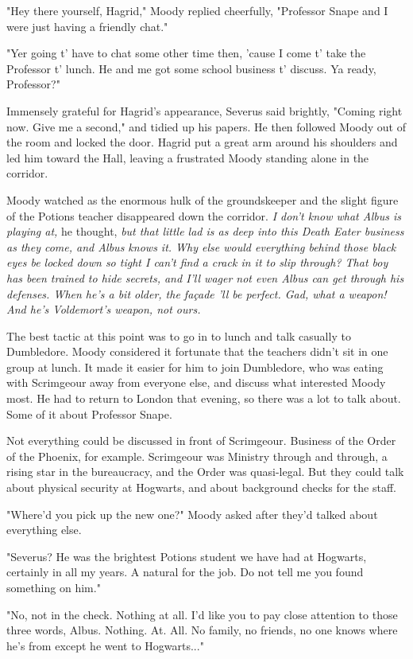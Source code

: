 "Hey there yourself, Hagrid," Moody replied cheerfully, "Professor Snape and I were just having a friendly chat."

"Yer going t' have to chat some other time then, 'cause I come t' take the Professor t' lunch. He and me got some school business t' discuss. Ya ready, Professor?"

Immensely grateful for Hagrid's appearance, Severus said brightly, "Coming right now. Give me a second," and tidied up his papers. He then followed Moody out of the room and locked the door. Hagrid put a great arm around his shoulders and led him toward the Hall, leaving a frustrated Moody standing alone in the corridor.

Moody watched as the enormous hulk of the groundskeeper and the slight figure of the Potions teacher disappeared down the corridor. \emph{I don't know what Albus is playing at,} he thought, \emph{but that little lad is as deep into this Death Eater business as they come, and Albus knows it. Why else would everything behind those black eyes be locked down so tight I can't find a crack in it to slip through? That boy has been trained to hide secrets, and I'll wager not even Albus can get through his defenses. When he's a bit older, the façade 'll be perfect. Gad, what a weapon! And he's Voldemort's weapon, not ours.}

The best tactic at this point was to go in to lunch and talk casually to Dumbledore. Moody considered it fortunate that the teachers didn't sit in one group at lunch. It made it easier for him to join Dumbledore, who was eating with Scrimgeour away from everyone else, and discuss what interested Moody most. He had to return to London that evening, so there was a lot to talk about. Some of it about Professor Snape.

Not everything could be discussed in front of Scrimgeour. Business of the Order of the Phoenix, for example. Scrimgeour was Ministry through and through, a rising star in the bureaucracy, and the Order was quasi-legal. But they could talk about physical security at Hogwarts, and about background checks for the staff.

"Where'd you pick up the new one?" Moody asked after they'd talked about everything else.

"Severus? He was the brightest Potions student we have had at Hogwarts, certainly in all my years. A natural for the job. Do not tell me you found something on him."

"No, not in the check. Nothing at all. I'd like you to pay close attention to those three words, Albus. Nothing. At. All. No family, no friends, no one knows where he's from except he went to Hogwarts..."

